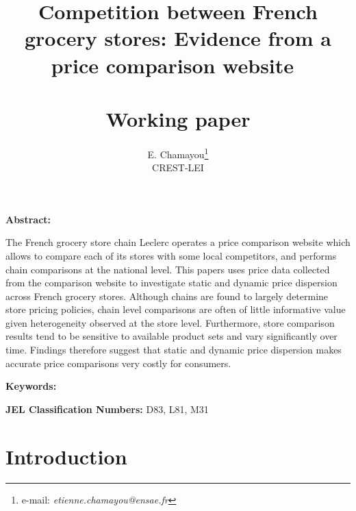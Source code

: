 \documentclass[english]{article}
\begin{document}
\title{Competition between French grocery stores: Evidence from a price comparison website\ \\ \ \\Working paper}
\author{E. Chamayou\thanks{e-mail:
\textit{etienne.chamayou@ensae.fr}} \\ CREST-LEI}
\maketitle

\sloppy%

\onehalfspacing

\textbf{Abstract:}

The French grocery store chain Leclerc operates a price comparison website which allows to compare each of its stores with some local competitors, and performs chain comparisons at the national level. This papers uses price data collected from the comparison website to investigate static and dynamic price dispersion across French grocery stores. Although chains are found to largely determine store pricing policies, chain level comparisons are often of little informative value given heterogeneity observed at the store level. Furthermore, store comparison results tend to be sensitive to available product sets and vary significantly over time. Findings therefore suggest that static and dynamic price dispersion makes accurate price comparisons very costly for consumers.

\strut

\textbf{Keywords:}

\strut

\textbf{JEL Classification Numbers:} D83, L81, M31

\pagebreak%
\begin{flushleft}

\end{flushleft}
\section{Introduction}
\end{document}
